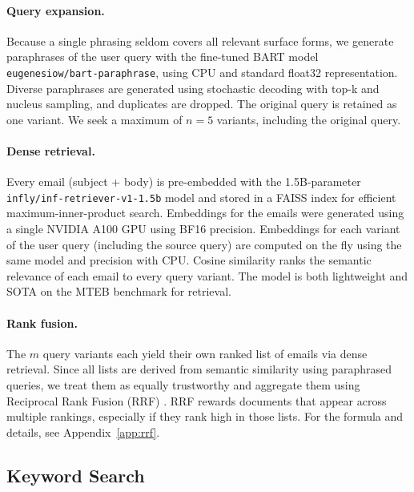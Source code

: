\documentclass{article}
\begin{document}
\paragraph{Query expansion.}
Because a single phrasing seldom covers all relevant surface forms, we generate  paraphrases of the user query with the fine-tuned BART model \texttt{eugenesiow/bart-paraphrase}, using CPU and standard float32 representation. Diverse paraphrases are generated using stochastic decoding with top-k and nucleus sampling, and duplicates are dropped. The original query is retained as one variant. We seek a maximum of \( n = 5\) variants, including the original query.

\paragraph{Dense retrieval.}
Every email (subject + body) is pre-embedded with the 1.5B-parameter \texttt{infly/inf-retriever-v1-1.5b} model and stored in a FAISS index for efficient maximum-inner-product search. Embeddings for the emails were generated using a single NVIDIA A100 GPU using BF16 precision. Embeddings for each variant of the user query (including the source query) are computed on the fly using the same model and precision with CPU. Cosine
similarity ranks the semantic relevance of each email to every query variant. The model is both lightweight and SOTA on the MTEB benchmark \citep{muennighoff2023mtebmassivetextembedding} for retrieval. 

\paragraph{Rank fusion.}
The \(m\) query variants each yield their own ranked list of emails via dense retrieval. Since all lists are derived from semantic similarity using paraphrased queries, we treat them as equally trustworthy and aggregate them using Reciprocal Rank Fusion (RRF) \citep{cormack2009reciprocal}. RRF rewards documents that appear across multiple rankings, especially if they rank high in those lists. For the formula and details, see Appendix~\ref{app:rrf}.

\subsection{Keyword Search}
\end{document}
